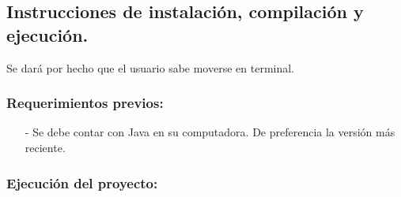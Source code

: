 \documentclass{article}
\begin{document}
\subsection*{Instrucciones de instalación, compilación y ejecución.}
Se dará por hecho que el usuario sabe moverse en terminal.\\

\subsubsection*{Requerimientos previos:}
\begin{itemize}
\item[-] Se debe contar con Java en su computadora. De preferencia la versión más reciente.
\end{itemize}

\subsubsection*{Ejecución del proyecto:}
\end{document}
